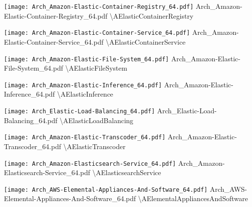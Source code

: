  {\texttt{[image: Arch\_Amazon-Elastic-Container-Registry\_64.pdf]}} {Arch\_Amazon-Elastic-Container-Registry\_64.pdf} {{\textbackslash}AElasticContainerRegistry}

 {\texttt{[image: Arch\_Amazon-Elastic-Container-Service\_64.pdf]}} {Arch\_Amazon-Elastic-Container-Service\_64.pdf} {{\textbackslash}AElasticContainerService}

 {\texttt{[image: Arch\_Amazon-Elastic-File-System\_64.pdf]}} {Arch\_Amazon-Elastic-File-System\_64.pdf} {{\textbackslash}AElasticFileSystem}

 {\texttt{[image: Arch\_Amazon-Elastic-Inference\_64.pdf]}} {Arch\_Amazon-Elastic-Inference\_64.pdf} {{\textbackslash}AElasticInference}

 {\texttt{[image: Arch\_Elastic-Load-Balancing\_64.pdf]}} {Arch\_Elastic-Load-Balancing\_64.pdf} {{\textbackslash}AElasticLoadBalancing}

 {\texttt{[image: Arch\_Amazon-Elastic-Transcoder\_64.pdf]}} {Arch\_Amazon-Elastic-Transcoder\_64.pdf} {{\textbackslash}AElasticTranscoder}

 {\texttt{[image: Arch\_Amazon-Elasticsearch-Service\_64.pdf]}} {Arch\_Amazon-Elasticsearch-Service\_64.pdf} {{\textbackslash}AElasticsearchService}

 {\texttt{[image: Arch\_AWS-Elemental-Appliances-And-Software\_64.pdf]}} {Arch\_AWS-Elemental-Appliances-And-Software\_64.pdf} {{\textbackslash}AElementalAppliancesAndSoftware}

